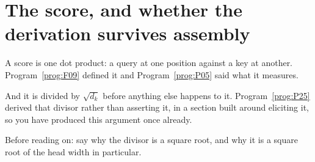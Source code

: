 \section{The score, and whether the derivation survives assembly}
\label{sec:P32-score}

\begin{fr}
A score is one dot product: a query at one position against a key at
another. Program~\ref{prog:F09} defined it and Program~\ref{prog:P05} said
what it measures.

And it is divided by $\sqrt{d_k}$ before anything else happens to it.
Program~\ref{prog:P25} derived that divisor rather than asserting it, in a
section built around eliciting it, so you have produced this argument once
already.

Before reading on: say why the divisor is a square root, and why it is a
square root of the head width in particular.
\dotline
\nextframe
\end{fr}

